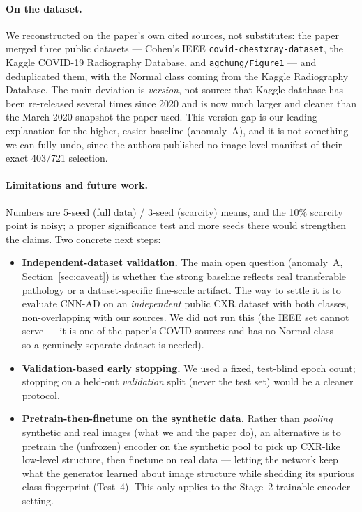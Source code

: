 \documentclass[11pt]{article}
\newcommand{\code}[1]{\texttt{#1}}
\begin{document}
\paragraph{On the dataset.} We reconstructed on the paper's own cited sources, not
substitutes: the paper merged three public datasets --- Cohen's IEEE
\code{covid-chestxray-dataset}, the Kaggle COVID-19 Radiography Database, and
\code{agchung/Figure1} --- and deduplicated them, with the Normal class coming from
the Kaggle Radiography Database. The main deviation is \emph{version}, not source:
that Kaggle database has been re-released several times since 2020 and is now much
larger and cleaner than the March-2020 snapshot the paper used. This version gap is
our leading explanation for the higher, easier baseline (anomaly~A), and it is not
something we can fully undo, since the authors published no image-level manifest of
their exact 403/721 selection.

\paragraph{Limitations and future work.} Numbers are 5-seed (full data) / 3-seed
(scarcity) means, and the 10\% scarcity point is noisy; a proper significance test
and more seeds there would strengthen the claims. Two concrete next steps:
\begin{itemize}[nosep,leftmargin=1.4em]
  \item \textbf{Independent-dataset validation.} The main open question (anomaly~A,
        Section~\ref{sec:caveat}) is whether the strong baseline reflects real
        transferable pathology or a dataset-specific fine-scale artifact. The way to
        settle it is to evaluate CNN-AD on an \emph{independent} public CXR dataset
        with both classes, non-overlapping with our sources. We did not run this
        (the IEEE set cannot serve --- it is one of the paper's COVID sources and
        has no Normal class --- so a genuinely separate dataset is needed).
  \item \textbf{Validation-based early stopping.} We used a fixed, test-blind epoch
        count; stopping on a held-out \emph{validation} split (never the test set)
        would be a cleaner protocol.
  \item \textbf{Pretrain-then-finetune on the synthetic data.} Rather than
        \emph{pooling} synthetic and real images (what we and the paper do), an
        alternative is to pretrain the (unfrozen) encoder on the synthetic pool to
        pick up CXR-like low-level structure, then finetune on real data ---
        letting the network keep what the generator learned about image structure
        while shedding its spurious class fingerprint (Test~4). This only applies to
        the Stage~2 trainable-encoder setting.
\end{itemize}
\end{document}

